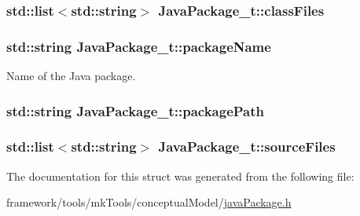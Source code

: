 \subsubsection[{\texorpdfstring{class\+Files}{classFiles}}]{\setlength{\rightskip}{0pt plus 5cm}std\+::list$<$std\+::string$>$ Java\+Package\+\_\+t\+::class\+Files}\hypertarget{struct_java_package__t_a09a28e6d358d8acaa31f48d3fc37cc63}{}\label{struct_java_package__t_a09a28e6d358d8acaa31f48d3fc37cc63}
\subsubsection[{\texorpdfstring{package\+Name}{packageName}}]{\setlength{\rightskip}{0pt plus 5cm}std\+::string Java\+Package\+\_\+t\+::package\+Name}\hypertarget{struct_java_package__t_af441320961cf097a4c1a4e04462b7e1c}{}\label{struct_java_package__t_af441320961cf097a4c1a4e04462b7e1c}


Name of the Java package. 

\subsubsection[{\texorpdfstring{package\+Path}{packagePath}}]{\setlength{\rightskip}{0pt plus 5cm}std\+::string Java\+Package\+\_\+t\+::package\+Path}\hypertarget{struct_java_package__t_acec02d6fb12d571115456c76127b0c01}{}\label{struct_java_package__t_acec02d6fb12d571115456c76127b0c01}
\subsubsection[{\texorpdfstring{source\+Files}{sourceFiles}}]{\setlength{\rightskip}{0pt plus 5cm}std\+::list$<$std\+::string$>$ Java\+Package\+\_\+t\+::source\+Files}\hypertarget{struct_java_package__t_abd07a137ffc00394723e14a9bbb5f512}{}\label{struct_java_package__t_abd07a137ffc00394723e14a9bbb5f512}


The documentation for this struct was generated from the following file\+:\begin{DoxyCompactItemize}
\item 
framework/tools/mk\+Tools/conceptual\+Model/\hyperlink{java_package_8h}{java\+Package.\+h}\end{DoxyCompactItemize}
